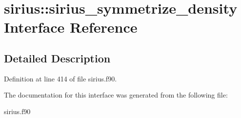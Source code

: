 \hypertarget{interfacesirius_1_1sirius__symmetrize__density}{}\section{sirius\+:\+:sirius\+\_\+symmetrize\+\_\+density Interface Reference}
\label{interfacesirius_1_1sirius__symmetrize__density}


\subsection{Detailed Description}


Definition at line 414 of file sirius.\+f90.



The documentation for this interface was generated from the following file\+:\begin{DoxyCompactItemize}
\item 
sirius.\+f90\end{DoxyCompactItemize}
